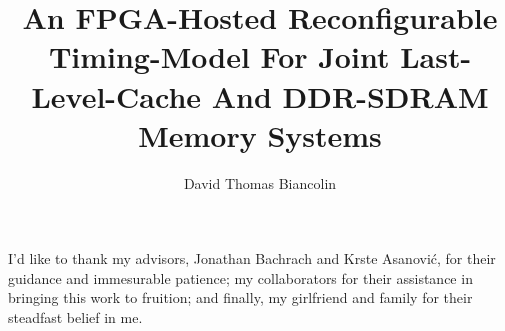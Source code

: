 \documentclass[masters]{ucbthesis}
\begin{document}

\title{An FPGA-Hosted Reconfigurable Timing-Model For Joint Last-Level-Cache And DDR-SDRAM Memory Systems}
\author{David Thomas Biancolin}


\clearpage

\maketitle

%

\begin{frontmatter}


\setcounter{tocdepth}{2}
\setcounter{secnumdepth}{2}
\tableofcontents
\clearpage
\listoffigures
\clearpage
\listoftables

    \begin{acknowledgements}

I'd like to thank my advisors, Jonathan Bachrach and Krste Asanovi\'c, for
their guidance and immesurable patience; my collaborators for their assistance in
bringing this work to fruition; and finally, my girlfriend and family for their steadfast belief in me.

    \end{acknowledgements}
\end{frontmatter}
\end{document}
